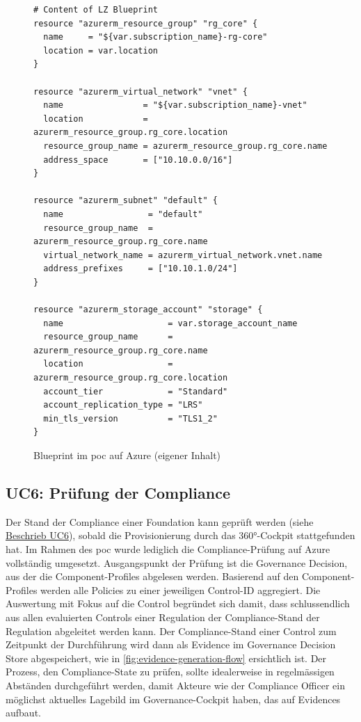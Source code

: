 \begin{figure}[H]
\centering
\begin{verbatim}
# Content of LZ Blueprint
resource "azurerm_resource_group" "rg_core" {
  name     = "${var.subscription_name}-rg-core"
  location = var.location
}

resource "azurerm_virtual_network" "vnet" {
  name                = "${var.subscription_name}-vnet"
  location            = azurerm_resource_group.rg_core.location
  resource_group_name = azurerm_resource_group.rg_core.name
  address_space       = ["10.10.0.0/16"]
}

resource "azurerm_subnet" "default" {
  name                 = "default"
  resource_group_name  = azurerm_resource_group.rg_core.name
  virtual_network_name = azurerm_virtual_network.vnet.name
  address_prefixes     = ["10.10.1.0/24"]
}

resource "azurerm_storage_account" "storage" {
  name                     = var.storage_account_name
  resource_group_name      = azurerm_resource_group.rg_core.name
  location                 = azurerm_resource_group.rg_core.location
  account_tier             = "Standard"
  account_replication_type = "LRS"
  min_tls_version          = "TLS1_2"
}
\end{verbatim}
\caption{Blueprint im \ac{poc} auf Azure (eigener Inhalt)}
\label{fig:example-lz-blueprint-content}
\end{figure}

\subsection{UC6: Prüfung der Compliance}

Der Stand der Compliance einer Foundation kann geprüft werden (siehe \hyperlink{usecase-uc6}{Beschrieb UC6}), sobald die Provisionierung durch das 360°-Cockpit stattgefunden hat. Im Rahmen des \ac{poc} wurde lediglich die Compliance-Prüfung auf Azure vollständig umgesetzt. Ausgangspunkt der Prüfung ist die Governance Decision, aus der die Component-Profiles abgelesen werden. Basierend auf den Component-Profiles werden alle Policies zu einer jeweiligen Control-ID aggregiert. Die Auswertung mit Fokus auf die Control begründet sich damit, dass schlussendlich aus allen evaluierten Controls einer Regulation der Compliance-Stand der Regulation abgeleitet werden kann. Der Compliance-Stand einer Control zum Zeitpunkt der Durchführung wird dann als Evidence im Governance Decision Store abgespeichert, wie in \autoref{fig:evidence-generation-flow} ersichtlich ist. Der Prozess, den Compliance-State zu prüfen, sollte idealerweise in regelmässigen Abständen durchgeführt werden, damit Akteure wie der Compliance Officer ein möglichst aktuelles Lagebild im Governance-Cockpit haben, das auf Evidences aufbaut.

